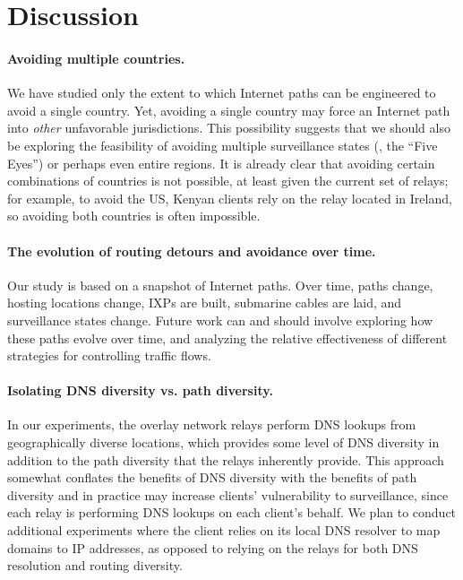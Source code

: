 \section{Discussion}
\label{discussion}

\paragraph{Avoiding multiple countries.} 
We have studied only the extent to which Internet paths can be
engineered to avoid a {single} country.  Yet, avoiding a single country
may force an Internet path into {\em other} unfavorable
jurisdictions. This possibility suggests that we should also be
exploring the feasibility of avoiding multiple surveillance states (\eg,
the ``Five Eyes'') or perhaps even entire regions. It is already clear
that avoiding certain combinations of countries is not possible, at
least given the current set of relays; for
example, to avoid the US, Kenyan clients rely on the relay located in
Ireland, so avoiding both countries is often impossible.

\paragraph{The evolution of routing detours and avoidance over time.}
Our study is based on a snapshot of Internet paths. Over time, paths
change, hosting locations change, IXPs are built, submarine cables are
laid, and surveillance states change.  Future work can and should
involve exploring how these paths evolve over time, and analyzing the
relative effectiveness of different strategies for controlling traffic flows.

\paragraph{Isolating DNS diversity vs. path diversity.}
In our experiments, the overlay network relays perform DNS lookups from
geographically diverse locations, which provides some level of DNS
diversity in addition to the path diversity that the relays inherently
provide. This approach somewhat conflates the benefits of DNS diversity
with the benefits of path diversity and in practice may increase
clients' vulnerability to surveillance, since each relay is performing
DNS lookups on each client's behalf. We plan to conduct additional
experiments where the client relies on its local DNS resolver to map
domains to IP addresses, as opposed to relying on the relays for both
DNS resolution and routing diversity.

